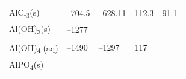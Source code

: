 \documentclass[
]{book}
\theoremstyle{definition}
\theoremstyle{definition}
\theoremstyle{definition}
\theoremstyle{remark}
\begin{document}
\begin{longtable}[]{@{}lllll@{}}
\begin{minipage}[t]{0.10\columnwidth}
AlCl\textsubscript{3}(s)\strut
\end{minipage} & \begin{minipage}[t]{0.19\columnwidth}\raggedright
--704.5\strut
\end{minipage} & \begin{minipage}[t]{0.20\columnwidth}\raggedright
--628.11\strut
\end{minipage} & \begin{minipage}[t]{0.18\columnwidth}\raggedright
112.3\strut
\end{minipage} & \begin{minipage}[t]{0.18\columnwidth}\raggedright
91.1\strut
\end{minipage}\tabularnewline
\begin{minipage}[t]{0.10\columnwidth}\raggedright
Al(OH)\textsubscript{3}(s)\strut
\end{minipage} & \begin{minipage}[t]{0.19\columnwidth}\raggedright
--1277\strut
\end{minipage} & \begin{minipage}[t]{0.20\columnwidth}\raggedright
\strut
\end{minipage} & \begin{minipage}[t]{0.18\columnwidth}\raggedright
\strut
\end{minipage} & \begin{minipage}[t]{0.18\columnwidth}\raggedright
\strut
\end{minipage}\tabularnewline
\begin{minipage}[t]{0.10\columnwidth}\raggedright
Al(OH)\textsubscript{4}\textsuperscript{-}(aq)\strut
\end{minipage} & \begin{minipage}[t]{0.19\columnwidth}\raggedright
--1490\strut
\end{minipage} & \begin{minipage}[t]{0.20\columnwidth}\raggedright
--1297\strut
\end{minipage} & \begin{minipage}[t]{0.18\columnwidth}\raggedright
117\strut
\end{minipage} & \begin{minipage}[t]{0.18\columnwidth}\raggedright
\strut
\end{minipage}\tabularnewline
\begin{minipage}[t]{0.10\columnwidth}\raggedright
AlPO\textsubscript{4}(s)\strut
\end{minipage} & \begin{minipage}[t]{0.19\columnwidth}\raggedright

\end{minipage}
\end{longtable}
\end{document}
